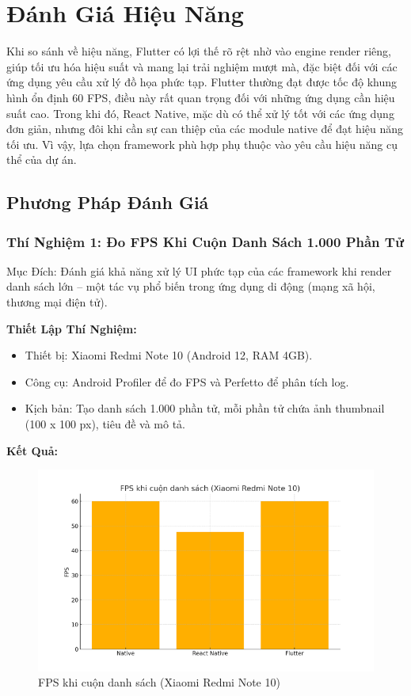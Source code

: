 \section{Đánh Giá Hiệu Năng}

  Khi so sánh về hiệu năng, Flutter có lợi thế rõ rệt nhờ vào engine render riêng, giúp tối ưu hóa hiệu suất và mang lại trải nghiệm mượt mà, đặc biệt đối với các ứng dụng yêu cầu xử lý đồ họa phức tạp. Flutter thường đạt được tốc độ khung hình ổn định 60 FPS, điều này rất quan trọng đối với những ứng dụng cần hiệu suất cao. Trong khi đó, React Native, mặc dù có thể xử lý tốt với các ứng dụng đơn giản, nhưng đôi khi cần sự can thiệp của các module native để đạt hiệu năng tối ưu. Vì vậy, lựa chọn framework phù hợp phụ thuộc vào yêu cầu hiệu năng cụ thể của dự án.

\subsection{Phương Pháp Đánh Giá}
\renewcommand{\labelitemi}{--}    
\subsubsection{Thí Nghiệm 1: Đo FPS Khi Cuộn Danh Sách 1.000 Phần Tử}

  Mục Đích: Đánh giá khả năng xử lý UI phức tạp của các framework khi render danh sách lớn – một tác vụ phổ biến trong ứng dụng di động (mạng xã hội, thương mại điện tử).

  \vspace{0.5em}

  \textbf{Thiết Lập Thí Nghiệm:}
  \setlength{\leftmargini}{1.5cm}
  \begin{itemize}
      \item Thiết bị: Xiaomi Redmi Note 10 (Android 12, RAM 4GB).
      \item Công cụ: Android Profiler để đo FPS và Perfetto để phân tích log.
      \item Kịch bản: Tạo danh sách 1.000 phần tử, mỗi phần tử chứa ảnh thumbnail (100 x 100 px), tiêu đề và mô tả.
  \end{itemize}

\vspace{0.5em}


\textbf{Kết Quả:}
\begin{figure}[H]
    \centering
    \includegraphics[width=0.75\linewidth]{images/performance_chart.png}
    \caption{FPS khi cuộn danh sách (Xiaomi Redmi Note 10)}
    \label{fig:overall2}
\end{figure}

